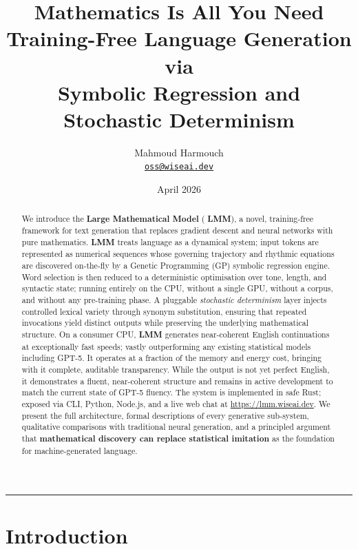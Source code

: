 \documentclass[11pt,a4paper]{article}
\title{%
  \vspace{-0.5cm}
  {\LARGE \textbf{Mathematics Is All You Need}}\\[6pt]
  {\large Training-Free Language Generation via\\[2pt]
   Symbolic Regression and Stochastic Determinism}
}
\author{%
  Mahmoud Harmouch\\[2pt]
  \texttt{\href{mailto:oss@wiseai.dev}{oss@wiseai.dev}}
}
\date{April 2026}
\newcommand{\lmm}{\texorpdfstring{%
  \textbf{\color{lmmAccent}LMM}}{LMM}}
\begin{document}
\maketitle

\begin{abstract}
\noindent
We introduce the \textbf{Large Mathematical Model} (\lmm{}), a novel, training-free framework for text generation that replaces gradient descent and neural networks with pure mathematics. \lmm{} treats language as a dynamical system; input tokens are represented as numerical sequences whose governing trajectory and rhythmic equations are discovered on-the-fly by a Genetic Programming (GP) symbolic regression engine. Word selection is then reduced to a deterministic optimisation over tone, length, and syntactic state; running entirely on the CPU, without a single GPU, without a corpus, and without any pre-training phase. A pluggable \textit{stochastic determinism} layer injects controlled lexical variety through synonym substitution, ensuring that repeated invocations yield distinct outputs while preserving the underlying mathematical structure. On a consumer CPU, \lmm{} generates near-coherent English continuations at exceptionally fast speeds; vastly outperforming any existing statistical models including GPT-5. It operates at a fraction of the memory and energy cost, bringing with it complete, auditable transparency. While the output is not yet perfect English, it demonstrates a fluent, near-coherent structure and remains in active development to match the current state of GPT-5 fluency. The system is implemented in safe Rust; exposed via CLI, Python, Node.js, and a live web chat at \url{https://lmm.wiseai.dev}. We present the full architecture, formal descriptions of every generative sub-system, qualitative comparisons with traditional neural generation, and a principled argument that \textbf{mathematical discovery can replace statistical imitation} as the foundation for machine-generated language.
\end{abstract}

\tableofcontents
\bigskip
{\color{lmmAccent}\hrule}

\section{Introduction}
\label{sec:intro}
\end{document}

